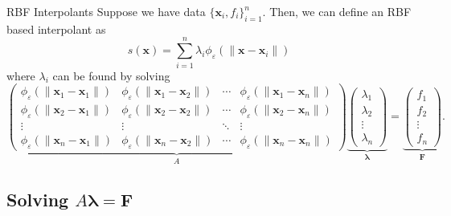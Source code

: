 \documentclass{cubeamer}
\newcommand{\eps}{\varepsilon}
\newcommand{\norm}[1]{\lVert #1 \rVert}
\newcommand{\pmat}[1]{\begin{pmatrix} #1 \end{pmatrix}}
\begin{document}
\begin{frame}{RBF Interpolants}
    Suppose we have data $ \{\mathbf{x}_i, f_i\}_{i = 1}^n $. \pause Then, we can define an RBF based interpolant as
    \[
    	s(\mathbf{x}) = \sum_{i = 1}^n \lambda_i \phi_\eps(\norm{\mathbf{x} - \mathbf{x}_i})
    \] \pause
    where $ \lambda_i $ can be found by solving
    \[
    	\underbrace{\pmat{
    			\phi_\eps (\norm{\mathbf{x}_1 - \mathbf{x}_1}) & \phi_\eps (\norm{\mathbf{x}_1 - \mathbf{x}_2}) & \cdots & \phi_\eps (\norm{\mathbf{x}_1 - \mathbf{x}_n}) \\
    			\phi_\eps (\norm{\mathbf{x}_2 - \mathbf{x}_1}) & \phi_\eps (\norm{\mathbf{x}_2 - \mathbf{x}_2}) & \cdots & \phi_\eps (\norm{\mathbf{x}_2 - \mathbf{x}_n}) \\
    			\vdots & \vdots & \ddots & \vdots \\
    			\phi_\eps (\norm{\mathbf{x}_n - \mathbf{x}_1}) & \phi_\eps (\norm{\mathbf{x}_n - \mathbf{x}_2}) & \cdots & \phi_\eps (\norm{\mathbf{x}_n - \mathbf{x}_n})
    	}}_{A} \underbrace{\pmat{
    			\lambda_1 \\ \lambda_2 \\ \vdots \\ \lambda_n
    	}}_{\pmb{\lambda}} = \underbrace{\pmat{
    			f_1 \\ f_2 \\ \vdots \\ f_n
    	}}_{\pmb{F}}.
    \]
\end{frame}

\subsection{Solving $ A \pmb{\lambda} = \pmb{F} $}
\end{document}
